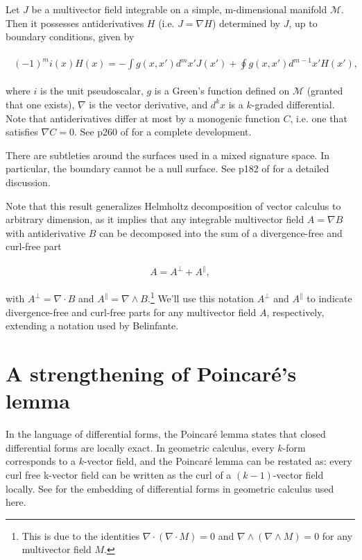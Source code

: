 \documentclass{article}
\begin{document}
Let $J$ be a multivector field integrable on a simple, m-dimensional manifold $\mathcal{M}$. Then it possesses antiderivatives $H$ (i.e. $J = \nabla H$) determined by $J$, up to boundary conditions, given by

\begin{align}
  \begin{split}
    (-1)^m i(x) H(x) = - \int g(x, x') d^m x' J(x') + \oint g(x, x') d^{m-1} x' H(x'),\label{eq:integral-formula}
  \end{split}
\end{align}

where $i$ is the unit pseudoscalar, $g$ is a Green's function defined on $\mathcal{M}$ (granted that one exists), $\nabla$ is the vector derivative, and $d^k x$ is a $k$-graded differential. Note that antiderivatives differ at most by a monogenic function $C$, i.e. one that satisfies $\nabla C = 0$. See p260 of \cite{cagc} for a complete development. 

There are subtleties around the surfaces used in a mixed signature space. In particular, the boundary cannot be a null surface. See p182 of \cite{gap} for a detailed discussion.

Note that this result generalizes Helmholtz decomposition of vector calculus to arbitrary dimension, as it implies that any integrable multivector field $A = \nabla B$ with antiderivative $B$ can be decomposed into the sum of a divergence-free and curl-free part

\begin{align}
  A = A^\perp + A^\parallel, \label{eq:helmholtz}
\end{align}

with $A^\perp = \nabla \cdot B$ and $A^\parallel = \nabla \wedge B.$\footnote{This is due to the identities $\nabla \cdot (\nabla \cdot M) = 0$ and $\nabla \wedge (\nabla \wedge M) = 0$ for any multivector field $M$.} We'll use this notation $A^\perp$ and $A^\parallel$ to indicate divergence-free and curl-free parts for any multivector field $A$, respectively, extending a notation used by Belinfante. \cite{belinfante}

\section{A strengthening of Poincar\'e's lemma}

In the language of differential forms, the Poincar\'e lemma states that closed differential forms are locally exact. In geometric calculus, every $k$-form corresponds to a $k$-vector field, and the Poincar\'e lemma can be restated as: every curl free k-vector field can be written as the curl of a $(k-1)$-vector field locally. See \cite{hestenes} for the embedding of differential forms in geometric calculus used here. 
\end{document}
